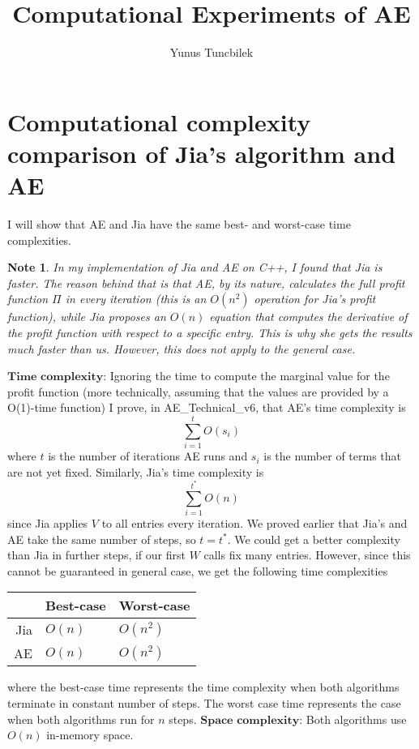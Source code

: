 \documentclass[11pt]{article}
\title{Computational Experiments of AE}
\author{Yunus Tuncbilek}
\newtheorem{note}[theorem]{Note}
\begin{document}
\maketitle
   
\section{Computational complexity comparison of Jia's algorithm and AE}
I will show that AE and Jia have the same best- and worst-case time complexities. 
\begin{note}In my implementation of Jia and AE on C++, I found that Jia is faster. The reason behind that is that AE, by its nature, calculates the full profit function $\Pi$ in every iteration (this is an $O(n^2)$ operation for Jia's profit function), while Jia proposes an $O(n)$ equation that computes the derivative of the profit function with respect to a specific entry. This is why she gets the results much  faster than us. However, this does not apply to the general case.
\end{note}
$\textbf{Time complexity:}$ Ignoring the time to compute the marginal value for the profit function (more technically, assuming that the values are provided by a O(1)-time function) I prove, in AE_Technical_v6, that AE's time complexity is 
\[\sum_{i=1}^t O(s_i)\]
where $t$ is the number of iterations AE runs and $s_i$ is the number of terms that are not yet fixed. Similarly, Jia's time complexity is \[\sum_{i=1}^{t^*} O(n)\]
since Jia applies $V$ to all entries every iteration. We proved earlier that Jia's and AE take the same number of steps, so $t = t^*$. We could get a better complexity than Jia in further steps, if our first $W$ calls fix many entries. However, since this cannot be guaranteed in  general case, we get the following time complexities \begin{center}
\begin{tabular}{|r|l|l|}
  \hline
  & Best-case & Worst-case \\ \hline
  Jia & $O(n)$ & $O(n^2)$ \\ \hline
  AE  & $O(n)$ & $O(n^2)$   \\ \hline
\end{tabular}
\end{center}
where the best-case time represents the time complexity when both algorithms terminate in constant number of steps. The worst case time represents the case when both algorithms run for $n$ steps.
$\textbf{Space complexity:}$ Both algorithms use $O(n)$ in-memory space.
\end{document}
